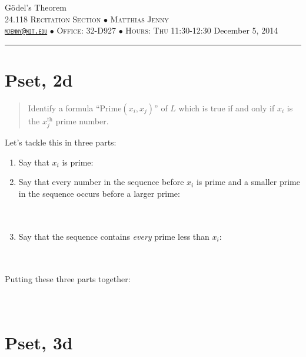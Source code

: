 \documentclass[justified]{tufte-handout}
\newcommand{\HRule}{\rule{\linewidth}{0.1mm}}
\begin{document}
\begin{fullwidth}
\noindent\LARGE G\"odel's Theorem  \normalsize \\[.3cm]
\noindent  \textsc{24.118 Recitation Section $\bullet$ Matthias Jenny\\  {\texttt{\href{mailto:mjenny@mit.edu}{mjenny@mit.edu}}} $\bullet$ Office:  32-D927 $\bullet$ Hours: Thu 11:30-12:30} \hfill{December 5, 2014}
\noindent\HRule
\end{fullwidth}

\section{Pset, 2d}

\begin{quote}Identify a formula ``Prime$(x_i,x_j)$'' of $L$ which is true if and only if $x_i$ is the $x_j^\mathrm{th}$ prime number.\end{quote}

Let's tackle this in three parts:

\begin{enumerate}
\item Say that $x_i$ is prime: \underline{\hspace{13.3cm}}\\
\item Say that every number in the sequence before $x_i$ is prime and a smaller prime in the sequence occurs before a larger prime: \underline{\hspace{7.22cm}}\\\\\underline{\hspace{16.44cm}}\\
\item Say that the sequence contains \emph{every} prime less than $x_i$: \underline{\hspace{7.94cm}}\\\\\underline{\hspace{16.44cm}}\\
\end{enumerate}
Putting these three parts together:  \underline{\hspace{11.51cm}}\\\\\underline{\hspace{16.85cm}}\\


\section{Pset, 3d}
\end{document}
